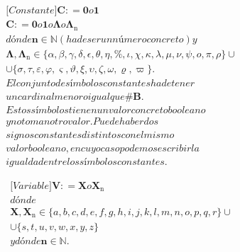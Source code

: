 \begin{enumerate}
\begin{enumerate}
\begin{enumerate}
\begin{enumerate}
        \[\begin{matrix}
        {{\lbrack\mathbf{\mathit{Constante}}\rbrack}{\mathbf{C}{: =}\mathbf{0}o\mathbf{1}}} \\
        {\mathbf{C}{: =}\mathbf{0}o\mathbf{1}o\mathbf{\Lambda}o\mathbf{\Lambda_{\mathrm{n}}}} \\
        {\mathit{dónde}{\mathbf{n} \in \mathbb{N}}{({\mathit{ha}\mathit{de}\mathit{ser}\mathit{un}\mathit{número}\mathit{concreto}})}y} \\
        {\mathbf{\Lambda},{\mathbf{\Lambda_{\mathrm{n}}} \in {{\{{\alpha,\beta,\gamma,\delta,\epsilon,\theta,\eta,\%,\iota,\chi,\kappa,\lambda,\mu,\nu,\psi,ο,\pi,\rho}\}} \cup}}} \\
        {{\cup {\{{\sigma,\tau,\varepsilon,\varphi,\varsigma,\vartheta,\xi,\upsilon,\zeta,\omega,\varrho,\varpi}\}}}.} \\
        {\mathit{El}\mathit{conjunto}\mathit{de}\mathit{símbolos}\mathit{constantes}\mathit{ha}\mathit{de}\mathit{tener}} \\
        {\mathit{un}\mathit{cardinal}\mathit{menor}o\mathit{igual}\mathit{que}\mathbf{\# B}.} \\
        {\mathit{Estos}\mathit{símbolos}\mathit{tienen}\mathit{un}\mathit{valor}\mathit{concreto}\mathit{booleano}} \\
        {y\mathit{no}\mathit{toman}\mathit{otro}\mathit{valor.}\mathit{Puede}\mathit{haber}\mathit{dos}} \\
        {\mathit{signos}\mathit{constantes}\mathit{distintos}\mathit{con}\mathit{el}\mathit{mismo}} \\
        {\mathit{valor}\mathit{booleano},\mathit{en}\mathit{cuyo}\mathit{caso}\mathit{podemos}\mathit{escribir}\mathit{la}} \\
        {\mathit{igualdad}\mathit{entre}\mathit{los}\mathit{símbolos}\mathit{constantes.}}
        \end{matrix}\]

        \[\begin{matrix}
        {{\lbrack\mathbf{\mathit{Variable}}\rbrack}\mathbf{V}{: =}\mathbf{X}o\mathbf{X_{\mathrm{n}}}} \\
        \mathit{dónde} \\
        {\mathbf{X},{\mathbf{X_{\mathrm{n}}} \in {{\{{a,b,c,d,e,f,g,h,i,j,k,l,m,n,o,p,q,r}\}} \cup}}} \\
        {{\cup {\{{s,t,u,v,w,x,y,z}\}}}\phantom{\{\}}} \\
        {y\mathit{dónde}\mathbf{n}{\in}\mathbf{\mathbb{N}}.}
        \end{matrix}\]


\end{enumerate}
\end{enumerate}
\end{enumerate}
\end{enumerate}
